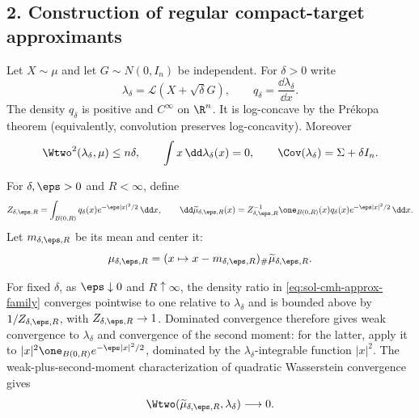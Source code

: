 \documentclass[../main.tex]{subfiles}
\begin{document}
\subsection*{2. Construction of regular compact-target approximants}

Let $X\sim\mu$ and let $G\sim N(0,I_n)$ be independent.  For $\delta>0$ write
\[
  \lambda_\delta=\mathcal L(X+\sqrt\delta G),
  \qquad
  q_\delta=\frac{\dd\lambda_\delta}{\dd x}.
\]
The density $q_\delta$ is positive and $C^\infty$ on $\R^n$.  It is log-concave by the
Pr\'ekopa theorem (equivalently, convolution preserves log-concavity).  Moreover
\begin{equation}
  \Wtwo^2(\lambda_\delta,\mu)\le n\delta,
  \qquad
  \int x\,\dd\lambda_\delta(x)=0,
  \qquad
  \Cov(\lambda_\delta)=\Sigma+\delta I_n.
  \label{eq:sol-cmh-approx-gaussian-smoothing}
\end{equation}

For $\delta,\eps>0$ and $R<\infty$, define
\begin{equation}
  Z_{\delta,\eps,R}
  =\int_{B(0,R)}q_\delta(x)e^{-\eps|x|^2/2}\,\dd x,
  \qquad
  \dd\widetilde\mu_{\delta,\eps,R}(x)
  =Z_{\delta,\eps,R}^{-1}\one_{B(0,R)}(x)
    q_\delta(x)e^{-\eps|x|^2/2}\,\dd x.
  \label{eq:sol-cmh-approx-family}
\end{equation}
Let $m_{\delta,\eps,R}$ be its mean and center it:
\begin{equation}
  \mu_{\delta,\eps,R}
  =(x\mapsto x-m_{\delta,\eps,R})_\#
    \widetilde\mu_{\delta,\eps,R}.
  \label{eq:sol-cmh-approx-centering}
\end{equation}

For fixed $\delta$, as $\eps\downarrow0$ and $R\uparrow\infty$, the density ratio in
\eqref{eq:sol-cmh-approx-family} converges pointwise to one relative to $\lambda_\delta$ and is
bounded above by $1/Z_{\delta,\eps,R}$, with
$Z_{\delta,\eps,R}\to1$.  Dominated convergence therefore gives weak convergence to
$\lambda_\delta$ and convergence of the second moment: for the latter, apply it to
$|x|^2\one_{B(0,R)}e^{-\eps|x|^2/2}$, dominated by the $\lambda_\delta$-integrable function
$|x|^2$.  The weak-plus-second-moment characterization of quadratic Wasserstein convergence
gives
\begin{equation}
  \Wtwo(\widetilde\mu_{\delta,\eps,R},\lambda_\delta)\longrightarrow0.
  \label{eq:sol-cmh-approx-fixed-delta}
\end{equation}
\end{document}
